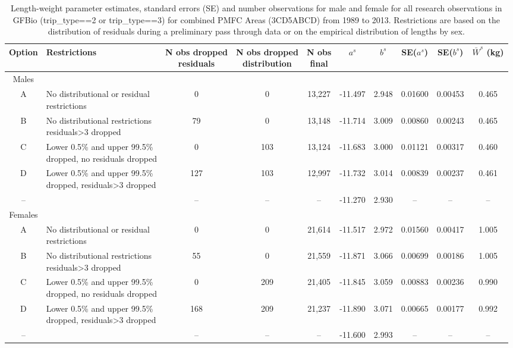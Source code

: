 \begin{table}[b]
\tiny
\centering
\caption{\label{tab:lwEst} Length-weight parameter estimates, standard errors (SE) and number observations for male and female \fishname for all research observations in GFBio (trip\_type==2 or trip\_type==3) for combined PMFC Areas (3CD5ABCD) from 1989 to 2013. Restrictions are based on the distribution of residuals during a preliminary pass through data or on the empirical distribution of lengths by sex.}
\begin{tabular}{clcccccccc}
\hline
Option & Restrictions & \specialcell{N obs dropped\\residuals} & \specialcell{N obs dropped\\distribution} & \specialcell{N obs\\final} & $a^s$ & $b^s$ & SE($a^s$) & SE($b^s$) & $\bar{W}^s$ (kg) \\
\hline
Males \\
A & \specialcell{No distributional or residual\\restrictions} & 0 & 0 & 13,227 & -11.497 & 2.948 & 0.01600 & 0.00453 & 0.465 \\
B & \specialcell{No distributional restrictions\\residuals\textgreater3 dropped} & 79 & 0 & 13,148 & -11.714 & 3.009 & 0.00860 & 0.00243 & 0.465 \\
C & \specialcell{Lower 0.5\% and upper 99.5\%\\dropped, no residuals dropped} & 0 & 103 & 13,124 & -11.683 & 3.000 & 0.01121 & 0.00317 & 0.460 \\
D & \specialcell{Lower 0.5\% and upper 99.5\%\\dropped, residuals\textgreater3 dropped} & 127 & 103 & 12,997 & -11.732 & 3.014 & 0.00839 & 0.00237 & 0.461 \\
-- & \citet{arf2001} & -- & -- & -- & -11.270 & 2.930 & -- & -- & -- \\
\hline
Females \\
A & \specialcell{No distributional or residual\\restrictions} & 0 & 0 & 21,614 & -11.517 & 2.972 & 0.01560 & 0.00417 & 1.005 \\
B & \specialcell{No distributional restrictions\\residuals\textgreater3 dropped} & 55 & 0 & 21,559 & -11.871 & 3.066 & 0.00699 & 0.00186 & 1.005 \\
C & \specialcell{Lower 0.5\% and upper 99.5\%\\dropped, no residuals dropped} & 0 & 209 & 21,405 & -11.845 & 3.059 & 0.00883 & 0.00236 & 0.990 \\
D & \specialcell{Lower 0.5\% and upper 99.5\%\\dropped, residuals\textgreater3 dropped} & 168 & 209 & 21,237 & -11.890 & 3.071 & 0.00665 & 0.00177 & 0.992 \\
-- & \citet{arf2001} & -- & -- & -- & -11.600 & 2.993 & -- & -- & -- \\
\hline
\end{tabular}
\end{table}

